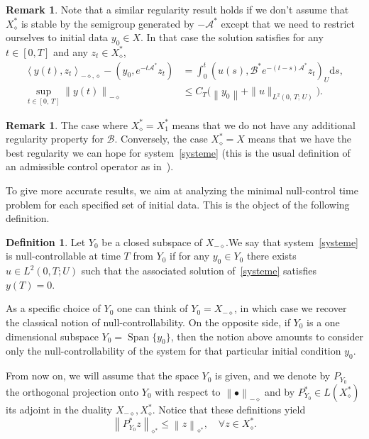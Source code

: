 \documentclass[11pt]{article}
\theoremstyle{definition}
\newtheorem{defi}[theo]{Definition}
\newtheorem{rema}[theo]{Remark}
\numberwithin{equation}{section}
\numberwithin{figure}{section}
\numberwithin{table}{section}
\newcommand\As{\mathcal{A}^*}
\newcommand\B{\mathcal{B}}
\newcommand\Bs{\mathcal{B}^*}
\newcommand{\Xuns}{X_1^*}
\newcommand{\Xalphas}{X_\diamond^*}
\newcommand{\Xmalpha}{X_{-\diamond}}
\newcommand{\Fzp}{Y_0}
\newcommand{\normeX}[1]{\left\| #1 \right\|}
\newcommand{\normeXalphas}[1]{\left\| #1 \right\|_{\diamond^*}}
\newcommand{\normeXmalpha}[1]{\left\| #1 \right\|_{-\diamond}}
\newcommand{\psX}[2]{\left(#1, #2 \right)}
\newcommand{\psU}[2]{\left(#1, #2 \right)_U}
\newcommand{\dual}[2]{\left\langle #1, #2 \right\rangle_{-\diamond,\diamond}}
\newcommand{\PF}{P_{\Fzp}}
\newcommand{\PFa}{P_{\Fzp}^*}
\newcommand{\md}{\mathrm{d}}
\DeclareMathOperator{\Span}{Span}
\renewcommand{\cdot}{{\scriptstyle \bullet}}
\let\oldforall\forall
\renewcommand*{\forall}{\mathrel{\oldforall}}
\begin{document}
\begin{rema}\label{Rem:Xdiamond_stable}
Note that a similar regularity result holds if we don't assume that $\Xalphas$ is stable by the semigroup generated by $-\As$ except that we need to restrict ourselves to initial data $y_0\in X$. In that case the solution satisfies for any $t \in [0,T]$ and any $z_t \in \Xalphas$,
\begin{align*}
\dual{y(t)}{z_t} - \psX{y_0}{e^{-t\As} z_t} &= \int_0^t \psU{u(s)}{ \Bs e^{-(t-s) \As} z_t} \md s,\\
\sup\limits_{t \in [0,\,T]} \normeXmalpha{y(t)} &\leq C_T \big(\normeX{y_0} + \| u \|_{L^2(0,\,T;\,U)} \big).
\end{align*}
\end{rema}

\begin{rema}
The case where $\Xalphas=\Xuns$ means that we do not have any additional regularity property for $\B$. Conversely, the case $\Xalphas=X$ means that we have the best regularity we can hope for system~\eqref{systeme} (this is the usual definition of an admissible control operator as in~\cite{CoronBook,TucsnakWeissBook}).
\end{rema}


To give more accurate results, we aim at analyzing the minimal null-control time problem for each specified set of initial data. This is the object of the following definition.

\begin{defi}
Let $\Fzp$ be a closed subspace of $\Xmalpha$.We say that system~\eqref{systeme} is null-controllable at time $T$ from $\Fzp$ if for any $y_0 \in \Fzp$ there exists $u \in L^2(0,T ; U)$ such that the associated solution of~\eqref{systeme} satisfies $y(T) = 0$.
\end{defi}

As a specific choice of $\Fzp$ one can think of $\Fzp = \Xmalpha$, in which case we recover the classical notion of null-controllability. On the opposite side, if $\Fzp$ is a one dimensional subspace $\Fzp = \Span\{ y_0 \}$, then the notion above amounts to consider only the null-controllability of the system for that particular initial condition $y_0$.


From now on, we will assume that the space $\Fzp$ is given, and we denote by $\PF$ the orthogonal projection onto $\Fzp$ with respect to $\normeXmalpha{\cdot}$ and by $\PFa\in L(\Xalphas)$ its adjoint in the duality $\Xmalpha, \Xalphas$. Notice that these definitions yield
\begin{equation}\label{PFa_norme_un}
\normeXalphas{\PFa z} \leq \normeXalphas{z}, \quad \forall z \in \Xalphas.
\end{equation}
\end{document}

